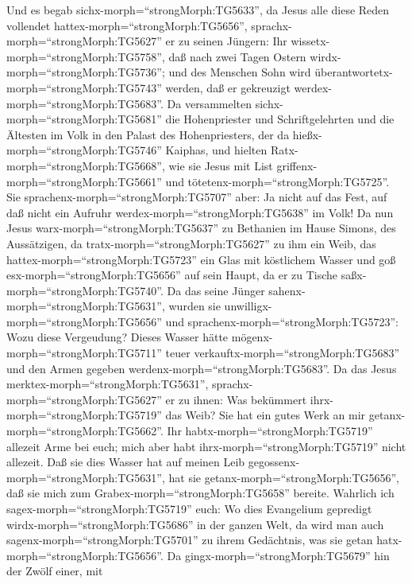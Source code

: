  Und es begab sichx-morph=``strongMorph:TG5633'', da Jesus
alle diese Reden vollendet hattex-morph=``strongMorph:TG5656'',
sprachx-morph=``strongMorph:TG5627'' er zu seinen Jüngern: 
Ihr wissetx-morph=``strongMorph:TG5758'', daß nach zwei Tagen Ostern
wirdx-morph=``strongMorph:TG5736''; und des Menschen Sohn wird
überantwortetx-morph=``strongMorph:TG5743'' werden, daß er gekreuzigt
werdex-morph=``strongMorph:TG5683''.  Da versammelten
sichx-morph=``strongMorph:TG5681'' die Hohenpriester und
Schriftgelehrten und die Ältesten im Volk in den Palast des
Hohenpriesters, der da hießx-morph=``strongMorph:TG5746'' Kaiphas,
 und hielten Ratx-morph=``strongMorph:TG5668'', wie sie
Jesus mit List griffenx-morph=``strongMorph:TG5661'' und
tötetenx-morph=``strongMorph:TG5725''.  Sie
sprachenx-morph=``strongMorph:TG5707'' aber: Ja nicht auf das Fest, auf
daß nicht ein Aufruhr werdex-morph=``strongMorph:TG5638'' im Volk!
 Da nun Jesus warx-morph=``strongMorph:TG5637'' zu Bethanien
im Hause Simons, des Aussätzigen,  da
tratx-morph=``strongMorph:TG5627'' zu ihm ein Weib, das
hattex-morph=``strongMorph:TG5723'' ein Glas mit köstlichem Wasser und
goß esx-morph=``strongMorph:TG5656'' auf sein Haupt, da er zu Tische
saßx-morph=``strongMorph:TG5740''.  Da das seine Jünger
sahenx-morph=``strongMorph:TG5631'', wurden sie
unwilligx-morph=``strongMorph:TG5656'' und
sprachenx-morph=``strongMorph:TG5723'': Wozu diese Vergeudung?
 Dieses Wasser hätte mögenx-morph=``strongMorph:TG5711''
teuer verkauftx-morph=``strongMorph:TG5683'' und den Armen gegeben
werdenx-morph=``strongMorph:TG5683''.  Da das Jesus
merktex-morph=``strongMorph:TG5631'',
sprachx-morph=``strongMorph:TG5627'' er zu ihnen: Was bekümmert
ihrx-morph=``strongMorph:TG5719'' das Weib? Sie hat ein gutes Werk an
mir getanx-morph=``strongMorph:TG5662''.  Ihr
habtx-morph=``strongMorph:TG5719'' allezeit Arme bei euch; mich aber
habt ihrx-morph=``strongMorph:TG5719'' nicht allezeit.  Daß
sie dies Wasser hat auf meinen Leib
gegossenx-morph=``strongMorph:TG5631'', hat sie
getanx-morph=``strongMorph:TG5656'', daß sie mich zum
Grabex-morph=``strongMorph:TG5658'' bereite.  Wahrlich ich
sagex-morph=``strongMorph:TG5719'' euch: Wo dies Evangelium gepredigt
wirdx-morph=``strongMorph:TG5686'' in der ganzen Welt, da wird man auch
sagenx-morph=``strongMorph:TG5701'' zu ihrem Gedächtnis, was sie getan
hatx-morph=``strongMorph:TG5656''.  Da
gingx-morph=``strongMorph:TG5679'' hin der Zwölf einer, mit
